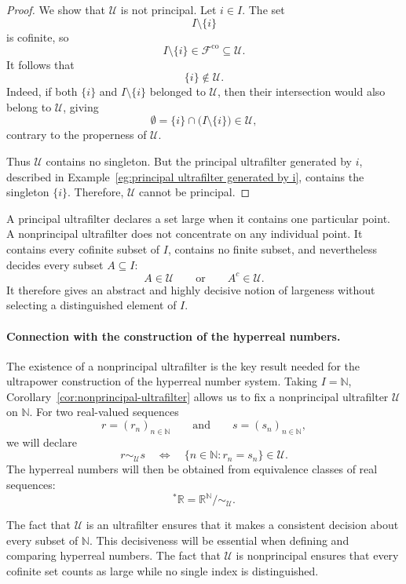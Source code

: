{\begin{proof}
We show that \(\mathcal{U}\) is not principal. Let \(i\in I\). The set
\[
I\setminus\{i\}
\]
is cofinite, so
\[
I\setminus\{i\}
\in
\mathcal{F}^{\mathrm{co}}
\subseteq
\mathcal{U}.
\]
It follows that
\[
\{i\}\notin\mathcal{U}.
\]
Indeed, if both \(\{i\}\) and \(I\setminus\{i\}\) belonged to
\(\mathcal{U}\), then their intersection would also belong to
\(\mathcal{U}\), giving
\[
\emptyset
=
\{i\}\cap\bigl(I\setminus\{i\}\bigr)
\in\mathcal{U},
\]
contrary to the properness of \(\mathcal{U}\).

Thus \(\mathcal{U}\) contains no singleton. But the principal ultrafilter
generated by \(i\), described in
Example~\ref{eg:principal ultrafilter generated by i}, contains the
singleton \(\{i\}\). Therefore, \(\mathcal{U}\) cannot be principal.
\end{proof}

A principal ultrafilter declares a set large when it contains one particular
point. A nonprincipal ultrafilter does not concentrate on any individual
point. It contains every cofinite subset of \(I\), contains no finite
subset, and nevertheless decides every subset \(A\subseteq I\):
\[
A\in\mathcal{U}
\qquad\text{or}\qquad
A^c\in\mathcal{U}.
\]
It therefore gives an abstract and highly decisive notion of largeness
without selecting a distinguished element of \(I\).

\paragraph{Connection with the construction of the hyperreal numbers.}
The existence of a nonprincipal ultrafilter is the key result needed for
the ultrapower construction of the hyperreal number system. Taking
\(I=\mathbb{N}\), Corollary~\ref{cor:nonprincipal-ultrafilter} allows us to
fix a nonprincipal ultrafilter \(\mathcal{U}\) on \(\mathbb{N}\). For two
real-valued sequences
\[
r=(r_n)_{n\in\mathbb{N}}
\qquad\text{and}\qquad
s=(s_n)_{n\in\mathbb{N}},
\]
we will declare
\[
r\sim_{\mathcal{U}}s
\quad\Longleftrightarrow\quad
\{n\in\mathbb{N}:r_n=s_n\}\in\mathcal{U}.
\]
The hyperreal numbers will then be obtained from equivalence classes of
real sequences:
\[
{}^{\ast}\mathbb{R}
=
\mathbb{R}^{\mathbb{N}}/{\sim_{\mathcal{U}}}.
\]

The fact that \(\mathcal{U}\) is an ultrafilter ensures that it makes a
consistent decision about every subset of \(\mathbb{N}\). This decisiveness
will be essential when defining and comparing hyperreal numbers. The fact
that \(\mathcal{U}\) is nonprincipal ensures that every cofinite set counts
as large while no single index is distinguished.

}
